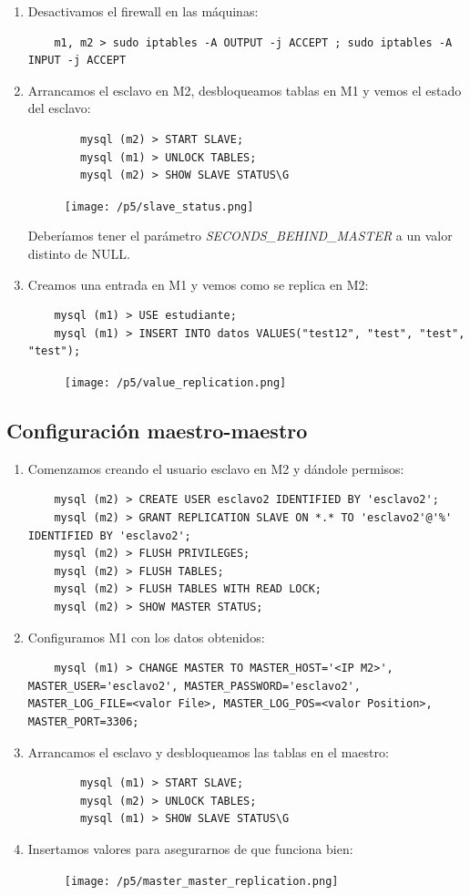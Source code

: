 \documentclass[12pt,spanish]{article}
\begin{document}
\begin{enumerate}
\begin{lstlisting}
	\end{lstlisting}
	\item Desactivamos el firewall en las máquinas:
	\begin{lstlisting}
	m1, m2 > sudo iptables -A OUTPUT -j ACCEPT ; sudo iptables -A INPUT -j ACCEPT
	\end{lstlisting}
	\item Arrancamos el esclavo en M2, desbloqueamos tablas en M1 y vemos el estado del esclavo:
	\begin{lstlisting}
		mysql (m2) > START SLAVE;
		mysql (m1) > UNLOCK TABLES;
		mysql (m2) > SHOW SLAVE STATUS\G
	\end{lstlisting}
	\begin{figure}[H]
		\centering
		\texttt{[image: /p5/slave\_status.png]}
	\end{figure}
	Deberíamos tener el parámetro \emph{SECONDS\_BEHIND\_MASTER} a un valor distinto de NULL.
	\item Creamos una entrada en M1 y vemos como se replica en M2:
	\begin{lstlisting}
	mysql (m1) > USE estudiante;
	mysql (m1) > INSERT INTO datos VALUES("test12", "test", "test", "test");
	\end{lstlisting}
	\begin{figure}[H]
		\centering
		\texttt{[image: /p5/value\_replication.png]}
	\end{figure}
\end{enumerate}
\subsection{Configuración maestro-maestro}
\begin{enumerate}
	\item Comenzamos creando el usuario esclavo en M2 y dándole permisos:
	\begin{lstlisting}
	mysql (m2) > CREATE USER esclavo2 IDENTIFIED BY 'esclavo2';
	mysql (m2) > GRANT REPLICATION SLAVE ON *.* TO 'esclavo2'@'%' IDENTIFIED BY 'esclavo2';
	mysql (m2) > FLUSH PRIVILEGES;
	mysql (m2) > FLUSH TABLES;
	mysql (m2) > FLUSH TABLES WITH READ LOCK;
	mysql (m2) > SHOW MASTER STATUS;
	\end{lstlisting}
	\item Configuramos M1 con los datos obtenidos:
	\begin{lstlisting}
	mysql (m1) > CHANGE MASTER TO MASTER_HOST='<IP M2>', MASTER_USER='esclavo2', MASTER_PASSWORD='esclavo2', MASTER_LOG_FILE=<valor File>, MASTER_LOG_POS=<valor Position>, MASTER_PORT=3306;
	\end{lstlisting}
	\item Arrancamos el esclavo y desbloqueamos las tablas en el maestro:
	\begin{lstlisting}
		mysql (m1) > START SLAVE;
		mysql (m2) > UNLOCK TABLES;
		mysql (m1) > SHOW SLAVE STATUS\G
	\end{lstlisting}
	\item Insertamos valores para asegurarnos de que funciona bien:
	\begin{figure}[H]
		\centering
		\texttt{[image: /p5/master\_master\_replication.png]}
	\end{figure}
\end{enumerate}
\end{document}
